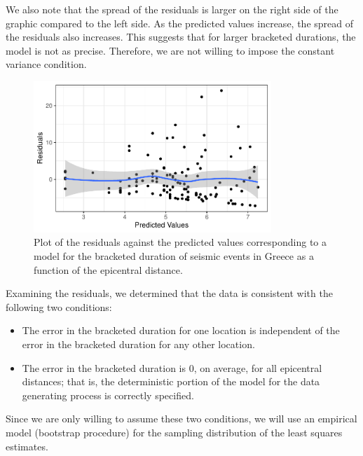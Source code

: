 \documentclass[
  letterpaper,
  DIV=11,
  numbers=noendperiod]{scrreprt}
\providecommand{\tightlist}{%
  \setlength{\itemsep}{0pt}\setlength{\parskip}{0pt}}\usepackage{longtable,booktabs,array}
\theoremstyle{plain}
\theoremstyle{definition}
\theoremstyle{definition}
\theoremstyle{remark}
\begin{document}
We also note that the spread of the residuals is larger on the right
side of the graphic compared to the left side. As the predicted values
increase, the spread of the residuals also increases. This suggests that
for larger bracketed durations, the model is not as precise. Therefore,
we are not willing to impose the constant variance condition.

\begin{figure}

{\centering \includegraphics[width=0.8\textwidth,height=\textheight]{./images/fig-regrecap-mean0-1.pdf}

}

\caption{\label{fig-regrecap-mean0}Plot of the residuals against the
predicted values corresponding to a model for the bracketed duration of
seismic events in Greece as a function of the epicentral distance.}

\end{figure}

Examining the residuals, we determined that the data is consistent with
the following two conditions:

\begin{itemize}
\tightlist
\item
  The error in the bracketed duration for one location is independent of
  the error in the bracketed duration for any other location.
\item
  The error in the bracketed duration is 0, on average, for all
  epicentral distances; that is, the deterministic portion of the model
  for the data generating process is correctly specified.
\end{itemize}

Since we are only willing to assume these two conditions, we will use an
empirical model (bootstrap procedure) for the sampling distribution of
the least squares estimates.
\end{document}
